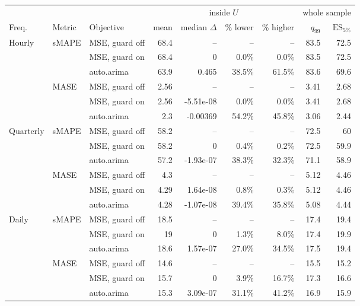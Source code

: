 \begin{tabular}{lllrrrrrr}
\toprule
 & & & \multicolumn{4}{c}{inside $U$} & \multicolumn{2}{c}{whole sample} \\
\cmidrule(lr){4-7}\cmidrule(lr){8-9}
Freq. & Metric & Objective & mean & median $\Delta$ & \% lower & \% higher & $q_{99}$ & $\mathrm{ES}_{5\%}$ \\
\midrule
Hourly & sMAPE & MSE, guard off & 68.4 & -- & -- & -- & 83.5 & 72.5 \\
 &  & MSE, guard on & 68.4 & 0 & 0.0\% & 0.0\% & 83.5 & 72.5 \\
 &  & auto.arima & 63.9 & 0.465 & 38.5\% & 61.5\% & 83.6 & 69.6 \\
 & MASE & MSE, guard off & 2.56 & -- & -- & -- & 3.41 & 2.68 \\
 &  & MSE, guard on & 2.56 & -5.51e-08 & 0.0\% & 0.0\% & 3.41 & 2.68 \\
 &  & auto.arima & 2.3 & -0.00369 & 54.2\% & 45.8\% & 3.06 & 2.44 \\
\addlinespace
Quarterly & sMAPE & MSE, guard off & 58.2 & -- & -- & -- & 72.5 & 60 \\
 &  & MSE, guard on & 58.2 & 0 & 0.4\% & 0.2\% & 72.5 & 59.9 \\
 &  & auto.arima & 57.2 & -1.93e-07 & 38.3\% & 32.3\% & 71.1 & 58.9 \\
 & MASE & MSE, guard off & 4.3 & -- & -- & -- & 5.12 & 4.46 \\
 &  & MSE, guard on & 4.29 & 1.64e-08 & 0.8\% & 0.3\% & 5.12 & 4.46 \\
 &  & auto.arima & 4.28 & -1.07e-08 & 39.4\% & 35.8\% & 5.08 & 4.44 \\
\addlinespace
Daily & sMAPE & MSE, guard off & 18.5 & -- & -- & -- & 17.4 & 19.4 \\
 &  & MSE, guard on & 19 & 0 & 1.3\% & 8.0\% & 17.4 & 19.9 \\
 &  & auto.arima & 18.6 & 1.57e-07 & 27.0\% & 34.5\% & 17.5 & 19.4 \\
 & MASE & MSE, guard off & 14.6 & -- & -- & -- & 15.5 & 15.2 \\
 &  & MSE, guard on & 15.7 & 0 & 3.9\% & 16.7\% & 17.3 & 16.6 \\
 &  & auto.arima & 15.3 & 3.09e-07 & 31.1\% & 41.2\% & 16.9 & 15.9 \\
\bottomrule
\end{tabular}
